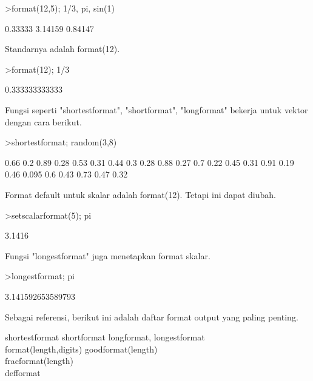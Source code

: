 \documentclass[a4paper,10pt]{article}
\begin{document}
\begin{eulernotebook}
\begin{eulerprompt}
>format(12,5); 1/3, pi, sin(1)
\end{eulerprompt}
\begin{euleroutput}
      0.33333 
      3.14159 
      0.84147 
\end{euleroutput}
\begin{eulercomment}
Standarnya adalah format(12).
\end{eulercomment}
\begin{eulerprompt}
>format(12); 1/3
\end{eulerprompt}
\begin{euleroutput}
  0.333333333333
\end{euleroutput}
\begin{eulercomment}
Fungsi seperti "shortestformat", "shortformat", "longformat" bekerja
untuk vektor dengan cara berikut.
\end{eulercomment}
\begin{eulerprompt}
>shortestformat; random(3,8)
\end{eulerprompt}
\begin{euleroutput}
    0.66    0.2   0.89   0.28   0.53   0.31   0.44    0.3 
    0.28   0.88   0.27    0.7   0.22   0.45   0.31   0.91 
    0.19   0.46  0.095    0.6   0.43   0.73   0.47   0.32 
\end{euleroutput}
\begin{eulercomment}
Format default untuk skalar adalah format(12). Tetapi ini dapat
diubah.
\end{eulercomment}
\begin{eulerprompt}
>setscalarformat(5); pi
\end{eulerprompt}
\begin{euleroutput}
  3.1416
\end{euleroutput}
\begin{eulercomment}
Fungsi "longestformat" juga menetapkan format skalar.
\end{eulercomment}
\begin{eulerprompt}
>longestformat; pi
\end{eulerprompt}
\begin{euleroutput}
  3.141592653589793
\end{euleroutput}
\begin{eulercomment}
Sebagai referensi, berikut ini adalah daftar format output yang paling
penting.

shortestformat shortformat longformat, longestformat\\
format(length,digits) goodformat(length)\\
fracformat(length)\\
defformat


\end{eulercomment}
\end{eulernotebook}
\end{document}
